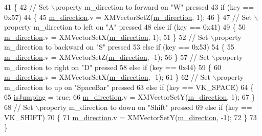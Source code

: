 \begin{DoxyCode}
41 \{
42     \textcolor{comment}{// Set \(\backslash\)property m\_direction to forward on "W" pressed}
43     \textcolor{keywordflow}{if} (key == 0x57)
44     \{
45         \mbox{\hyperlink{class_camera_helper_af2822e6b05e48f33100c2f678e3776ce}{m\_direction}}.v = XMVectorSetZ(\mbox{\hyperlink{class_camera_helper_af2822e6b05e48f33100c2f678e3776ce}{m\_direction}}, 1);
46     \}
47     \textcolor{comment}{// Set \(\backslash\)property m\_direction to left on "A" pressed}
48     \textcolor{keywordflow}{else} \textcolor{keywordflow}{if} (key == 0x41)
49     \{
50         \mbox{\hyperlink{class_camera_helper_af2822e6b05e48f33100c2f678e3776ce}{m\_direction}}.v = XMVectorSetX(\mbox{\hyperlink{class_camera_helper_af2822e6b05e48f33100c2f678e3776ce}{m\_direction}}, 1);
51     \}
52     \textcolor{comment}{// Set \(\backslash\)property m\_direction to backward on "S" pressed}
53     \textcolor{keywordflow}{else} \textcolor{keywordflow}{if} (key == 0x53)
54     \{
55         \mbox{\hyperlink{class_camera_helper_af2822e6b05e48f33100c2f678e3776ce}{m\_direction}}.v = XMVectorSetZ(\mbox{\hyperlink{class_camera_helper_af2822e6b05e48f33100c2f678e3776ce}{m\_direction}}, -1);
56     \}
57     \textcolor{comment}{// Set \(\backslash\)property m\_direction to right on "D" pressed}
58     \textcolor{keywordflow}{else} \textcolor{keywordflow}{if} (key == 0x44)
59     \{
60         \mbox{\hyperlink{class_camera_helper_af2822e6b05e48f33100c2f678e3776ce}{m\_direction}}.v = XMVectorSetX(\mbox{\hyperlink{class_camera_helper_af2822e6b05e48f33100c2f678e3776ce}{m\_direction}}, -1);
61     \}
62     \textcolor{comment}{// Set \(\backslash\)property m\_direction to up on "SpaceBar" pressed}
63     \textcolor{keywordflow}{else} \textcolor{keywordflow}{if} (key == VK\_SPACE)
64     \{
65         \mbox{\hyperlink{class_camera_helper_ac0dd816f2a5e8b4030b62e703ab92861}{isJumping}} = \textcolor{keyword}{true};
66         \mbox{\hyperlink{class_camera_helper_af2822e6b05e48f33100c2f678e3776ce}{m\_direction}}.v = XMVectorSetY(\mbox{\hyperlink{class_camera_helper_af2822e6b05e48f33100c2f678e3776ce}{m\_direction}}, 1);
67     \}
68     \textcolor{comment}{// Set \(\backslash\)property m\_direction to down on "Shift" pressed}
69     \textcolor{keywordflow}{else} \textcolor{keywordflow}{if} (key == VK\_SHIFT)
70     \{
71         \mbox{\hyperlink{class_camera_helper_af2822e6b05e48f33100c2f678e3776ce}{m\_direction}}.v = XMVectorSetY(\mbox{\hyperlink{class_camera_helper_af2822e6b05e48f33100c2f678e3776ce}{m\_direction}}, -1);
72     \}
73 \}
\end{DoxyCode}
\mbox{\label{class_camera_helper_ab7a651ac749461d078779b8c0accd9a7}} 
